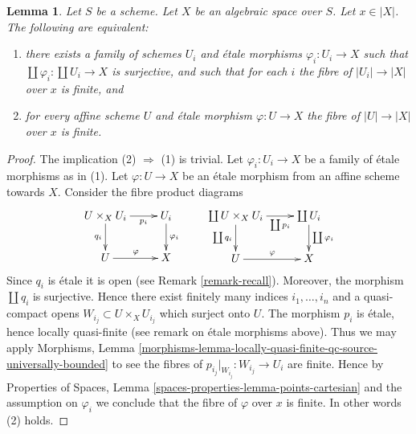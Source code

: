 \documentclass{stacks-project}
\theoremstyle{plain}
\newtheorem{lemma}[subsection]{Lemma}
\theoremstyle{definition}
\theoremstyle{remark}
\numberwithin{equation}{subsection}
\begin{document}
\begin{lemma}
\label{lemma-U-finite-above-x}
Let $S$ be a scheme. Let $X$ be an algebraic space over $S$.
Let $x \in |X|$. The following are equivalent:
\begin{enumerate}
\item there exists a family of schemes $U_i$ and
\'etale morphisms $\varphi_i : U_i \to X$ such that
$\coprod \varphi_i : \coprod U_i \to X$ is surjective,
and such that for each $i$ the fibre of
$|U_i| \to |X|$ over $x$ is finite, and
\item for every affine scheme $U$ and \'etale morphism $\varphi : U \to X$
the fibre of $|U| \to |X|$ over $x$ is finite.
\end{enumerate}
\end{lemma}

\begin{proof}
The implication (2) $\Rightarrow$ (1) is trivial.
Let $\varphi_i : U_i \to X$ be a family of \'etale morphisms as in (1).
Let $\varphi : U \to X$ be an \'etale morphism from an affine scheme
towards $X$. Consider the fibre product diagrams
$$
\xymatrix{
U \times_X U_i \ar[r]_-{p_i} \ar[d]_{q_i} & U_i \ar[d]^{\varphi_i} \\
U \ar[r]^\varphi & X
}
\quad \quad
\xymatrix{
\coprod U \times_X U_i \ar[r]_-{\coprod p_i} \ar[d]_{\coprod q_i} &
\coprod U_i \ar[d]^{\coprod \varphi_i} \\
U \ar[r]^\varphi & X
}
$$
Since $q_i$ is \'etale it is open (see Remark \ref{remark-recall}).
Moreover, the morphism $\coprod q_i$ is surjective.
Hence there exist finitely many indices $i_1, \ldots, i_n$ and
a quasi-compact opens $W_{i_j} \subset U \times_X U_{i_j}$
which surject onto $U$.
The morphism $p_i$ is \'etale, hence locally quasi-finite (see remark on
\'etale morphisms above). Thus we may apply
Morphisms, Lemma
\ref{morphisms-lemma-locally-quasi-finite-qc-source-universally-bounded}
to see the fibres of $p_{i_j}|_{W_{i_j}} : W_{i_j} \to U_i$ are finite.
Hence by
Properties of Spaces,
Lemma \ref{spaces-properties-lemma-points-cartesian}
and the assumption on $\varphi_i$ we conclude that the fibre
of $\varphi$ over $x$ is finite. In other words (2) holds.
\end{proof}
\end{document}
